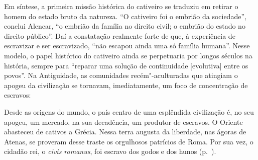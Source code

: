 Em síntese, a primeira missão histórica do cativeiro se traduziu em
retirar o homem do estado bruto da natureza. ``O cativeiro foi o embrião
da sociedade'', conclui Alencar, ``o embrião da família no direito civil;
o embrião do estado no direito público''. Daí a constatação realmente
forte de que, à  experiência de escravizar e ser escravizado, ``não
escapou ainda uma só família humana''. Nesse modelo, o papel histórico
do cativeiro ainda se perpetuaria por longos séculos na história,
sempre para ``reparar uma solução de continuidade [evolutiva] entre os
povos''. Na Antiguidade, as comunidades recém"-aculturadas que atingiam
o apogeu da civilização se tornavam, imediatamente, um foco de
concentração de escravos: 

\begin{hedraquote}
Desde as origens do mundo, o país centro de uma esplêndida civilização 
é, no seu apogeu, um mercado, na sua decadência, um produtor de
escravos. O Oriente abasteceu de cativos a Grécia. Nessa terra augusta
da liberdade, nas ágoras de Atenas, se proveram desse traste os
orgulhosos patrícios de Roma. Por sua vez, o cidadão rei, o
\textit{civis romanus}, foi escravo dos godos e dos hunos (p.~\pageref{origem}).
\end{hedraquote}

